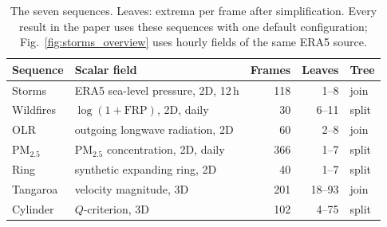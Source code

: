 \begin{table}[t]
\centering
\caption{The seven sequences. Leaves: extrema per frame after simplification. Every result in the paper uses these sequences with one default configuration; Fig.~\ref{fig:storms_overview} uses hourly fields of the same ERA5 source.}
\label{tab:data}
\footnotesize
\setlength{\tabcolsep}{2.5pt}
\renewcommand{\arraystretch}{0.95}
\begin{tabular*}{\columnwidth}{@{\extracolsep{\fill}}llrrl@{}}
\toprule
Sequence & Scalar field & Frames & Leaves & Tree \\
\midrule
Storms~\cite{Hersbach:2020:ERA5} & ERA5 sea-level pressure, 2D, 12\,h & 118 & 1--8 & join \\
Wildfires~\cite{Franke:2021:1DP} & $\log(1+\mathrm{FRP})$, 2D, daily & 30 & 6--11 & split \\
OLR~\cite{NOAA:OLR} & outgoing longwave radiation, 2D & 60 & 2--8 & join \\
PM$_{2.5}$~\cite{Dong:2026:PM25} & PM$_{2.5}$ concentration, 2D, daily & 366 & 1--7 & split \\
Ring~\cite{Koepp:2023:TMTM} & synthetic expanding ring, 2D & 40 & 1--7 & split \\
Tangaroa~\cite{Popinet:2004:Tangaroa} & velocity magnitude, 3D & 201 & 18--93 & join \\
Cylinder~\cite{Camarri:2005:Cylinder,Weinkauf:SquareCylinder} & $Q$-criterion, 3D & 102 & 4--75 & split \\
\bottomrule
\end{tabular*}
\end{table}
